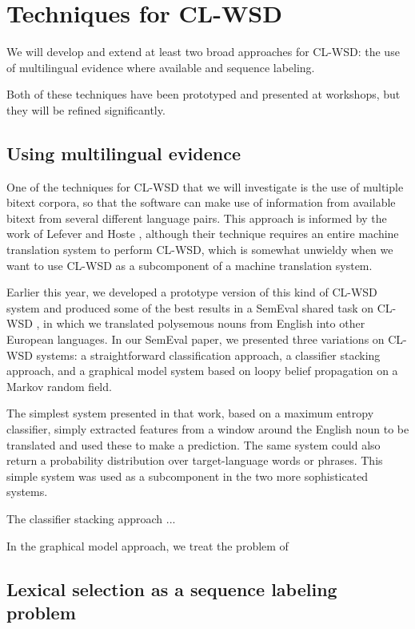 \section{Techniques for CL-WSD}

We will develop and extend at least two broad approaches for CL-WSD: the use
of multilingual evidence where available and sequence labeling.

Both of these techniques have been prototyped and presented at workshops, but
they will be refined significantly.

\subsection{Using multilingual evidence}
One of the techniques for CL-WSD that we will investigate is the use of
multiple bitext corpora, so that the software can make use of information from
available bitext from several different language pairs.
This approach is informed by the work of Lefever and Hoste
\cite{lefever-hoste-decock:2011:ACL-HLT2011}, although their technique requires
an entire machine translation system to perform CL-WSD, which is somewhat
unwieldy when we want to use CL-WSD as a subcomponent of a machine translation
system.

Earlier this year, we developed a prototype version of this kind of CL-WSD
system \cite{rudnick-liu-gasser:2013:SemEval-2013} and produced some of the
best results in a SemEval shared task on CL-WSD \cite{task10}, in which we
translated polysemous nouns from English into other European languages. In our
SemEval paper, we presented three variations on CL-WSD systems: a
straightforward classification approach, a classifier stacking approach, and a
graphical model system based on loopy belief propagation on a Markov random
field.

The simplest system presented in that work, based on a maximum entropy
classifier, simply extracted features from a window around the English noun to
be translated and used these to make a prediction. The same system could also
return a probability distribution over target-language words or phrases. This
simple system was used as a subcomponent in the two more sophisticated systems.


The classifier stacking approach ...


In the graphical model approach, we treat the problem of 


\subsection{Lexical selection as a sequence labeling problem}

